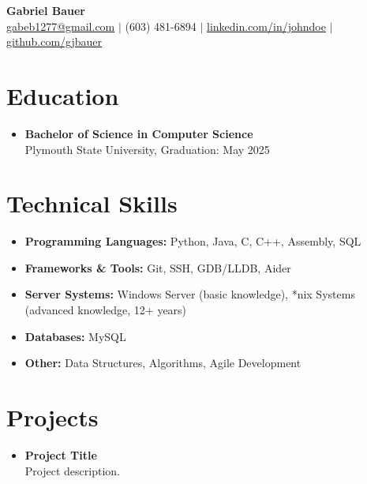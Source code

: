 \documentclass[11pt]{article}
\begin{document}
\begin{center}
    {\LARGE \textbf{Gabriel Bauer}} \\
    \vspace{0.1in}
    \href{mailto:gabeb1277@gmail.com}{gabeb1277@gmail.com} $\vert$ 
    (603) 481-6894 $\vert$ 
    \href{https://linkedin.com/in/johndoe}{linkedin.com/in/johndoe} $\vert$
    \href{https://github.com/gjbauer}{github.com/gjbauer}
\end{center}

\section*{Education}
\vspace{-0.1in}
\begin{itemize}[leftmargin=*]
    \item \textbf{Bachelor of Science in Computer Science} \\
    Plymouth State University, Graduation: May 2025 \\
\end{itemize}

\section*{Technical Skills}
\vspace{-0.1in}
\begin{itemize}[leftmargin=*]
    \item \textbf{Programming Languages:} Python, Java, C, C++, Assembly, SQL
    \item \textbf{Frameworks \& Tools:} Git, SSH, GDB/LLDB, Aider
    \item \textbf{Server Systems:} Windows Server (basic knowledge), *nix Systems (advanced knowledge, 12+ years)
    \item \textbf{Databases:} MySQL
    \item \textbf{Other:} Data Structures, Algorithms, Agile Development
\end{itemize}

\section*{Projects}
\vspace{-0.1in}
\begin{itemize}[leftmargin=*]
    \item \textbf{Project Title} \\
    Project description.
\end{itemize}
\end{document}
